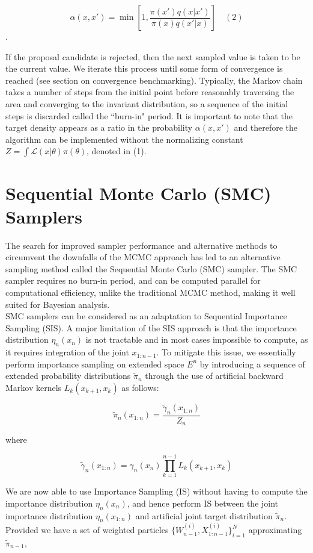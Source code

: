 \documentclass[12pt]{elsarticle}
\begin{document}
\[
\alpha(x,x') = \min{\left[1, \frac{\pi(x') q(x|x')}{\pi(x)q(x'|x)}\right]} \quad (2)
\].

If the proposal candidate is rejected, then the next sampled value is taken to be the current value. We iterate this process until some form of convergence is reached (see section on convergence benchmarking). Typically, the Markov chain takes a number of steps from the initial point before reasonably traversing the area and converging to the invariant distribution, so a sequence of the initial steps is discarded called the ``burn-in" period. It is important to note that the target density appears as a ratio in the probability $ \alpha(x,x')$ and therefore the algorithm can be implemented without the normalizing constant $Z = \int \mathcal{L}(x|\theta)\pi(\theta)$, denoted in (1).

\section*{Sequential Monte Carlo (SMC) Samplers}
The search for improved sampler performance and alternative methods to circumvent the downfalls of the MCMC approach has led to an alternative sampling method called the Sequential Monte Carlo (SMC) sampler. The SMC sampler requires no burn-in period, and can be computed parallel for computational efficiency, unlike the traditional MCMC method, making it well suited for Bayesian analysis. \\

SMC samplers can be considered as an adaptation to Sequential Importance Sampling (SIS). A major limitation of the SIS approach is that the importance distribution $\eta_n(x_n)$ is not tractable and in most cases impossible to compute, as it requires integration of the joint $x_{1:n-1}$. To mitigate this issue,  we essentially perform importance sampling on extended space $E^n$ by introducing a sequence of extended probability distributions $\tilde{\pi}_n$ through the use of artificial backward Markov kernels $L_k(x_{k+1},x_k)$ as follows:

\[
\tilde{\pi}_n(x_{1:n}) = \frac{\tilde{\gamma}_n(x_{1:n})}{Z_n}
\]

where 

\[
\tilde{\gamma}_n(x_{1:n}) = \gamma_n(x_n) \prod_{k=1}^{n-1} L_k(x_{k+1},x_k)
\]

We are now able to use Importance Sampling (IS) without having to compute the importance distribution $\eta_n(x_n)$, and hence perform IS between the joint importance distribution $\eta_n(x_{1:n})$ and artificial joint target distribution $\tilde{\pi}_n$. Provided we have a set of weighted particles $\{W_{n-1}^{(i)}, X_{1:n-1}^{(i)}\}_{i=1}^N$ approximating $\tilde{\pi}_{n-1}$,
\end{document}

